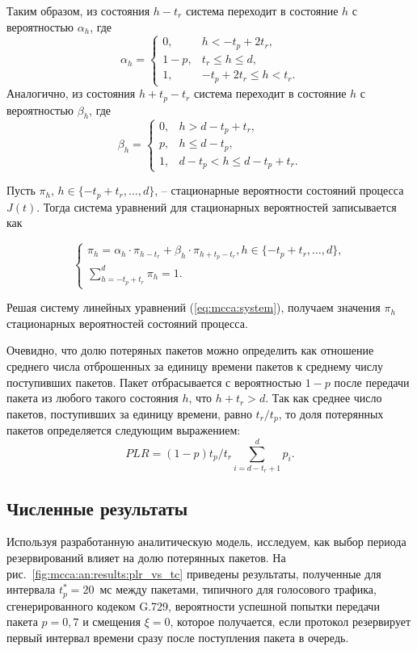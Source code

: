 Таким образом, из состояния $h-t_r$ система переходит в состояние $h$ с вероятностью $\alpha_h$, где
\[
\alpha_h = \left\{\begin{array}{ll}
    0,  &   h < -t_p+2t_r,  \\
    1-p,	&    t_r\leq h \leq d,      \\
    1,	&    -t_p+2t_r \leq h < t_r.
    \end{array} \right.
\]
Аналогично, из состояния $h+t_p-t_r$ система переходит в состояние $h$ с вероятностью $\beta_h$, где
\[
 \beta_h = \left\{ \begin{array}{ll}
    0,      &   h > d-t_p + t_r, \\
    p,    &	h \leq d-t_p,      \\
    1,      &	d-t_p < h \leq d - t_p + t_r.
    \end{array} \right.
\]

Пусть $\pi_{h}$, $h \in \{-t_p+t_r, \ldots, d\}$, -- стационарные вероятности состояний процесса $J(t)$. Тогда система уравнений для стационарных вероятностей записывается как

\begin{equation}\label{eq:mcca:system}
    \left\{
    \begin{array}{l}
    \pi_{h}= \alpha_h \cdot \pi_{h-t_r} + \beta_h \cdot \pi_{h+t_p-t_r}, h \in \{-t_p+t_r, \ldots, d\}, \\
    \sum \limits_{h=-t_p+t_r}^{d} \pi_{h} = 1.
    \end{array}
    \right.
\end{equation}

Решая систему линейных уравнений (\ref{eq:mcca:system}), получаем значения $\pi_{h}$ стационарных вероятностей состояний процесса.

Очевидно, что долю потеряных пакетов можно определить как отношение среднего числа  отброшенных за единицу времени пакетов к среднему числу поступивших пакетов. Пакет отбрасывается с вероятностью $1-p$ после передачи пакета из любого такого состояния  $h$, что $h+t_r> d$. Так как среднее число пакетов, поступивших за единицу времени, равно $t_r/t_p$, то доля потерянных пакетов определяется следующим выражением:
\begin{equation*}
   PLR=(1-p) t_p/t_r\sum_{i = d - t_r+1}^{d} p_{i}.
\end{equation*}

\subsection{Численные результаты}
Используя разработанную аналитическую модель, исследуем, как выбор периода резервирований влияет на долю потерянных пакетов. На рис.~\ref{fig:mcca:an:results:plr_vs_tc} приведены результаты, полученные для интервала $t_p^* = 20$~мс между пакетами, типичного для голосового трафика, сгенерированного кодеком G.729, вероятности успешной попытки передачи пакета $p = 0,7$ и смещения $\xi=0$, которое получается, если протокол резервирует первый интервал времени сразу после поступления пакета в очередь.

